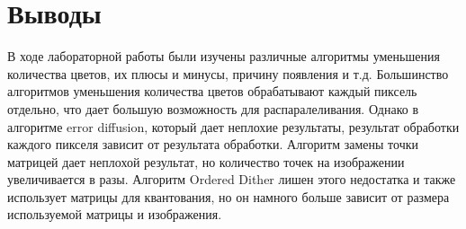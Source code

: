 \section{Выводы}
В ходе лабораторной работы были изучены различные алгоритмы уменьшения количества цветов, их плюсы и минусы, причину появления и т.д. Большинство алгоритмов уменьшения количества цветов обрабатывают каждый пиксель отдельно, что дает большую возможность для распаралеливания. Однако в алгоритме error diffusion, который дает неплохие результаты, результат обработки каждого пикселя зависит от результата обработки. Алгоритм замены точки матрицей дает неплохой результат, но количество точек на изображении увеличивается в разы. Алгоритм Ordered Dither лишен этого недостатка и также использует матрицы для квантования, но он намного больше зависит от размера используемой матрицы и изображения.